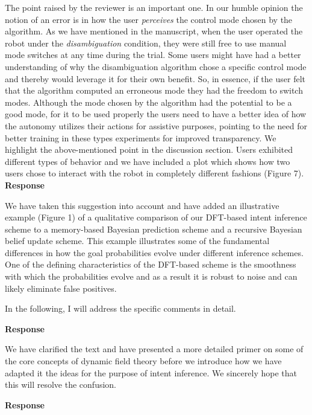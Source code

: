 \documentclass[a4paper,twoside,11pt]{reviewresponse}
\begin{document}
The point raised by the reviewer is an important one.  In our humble opinion the notion of an error is in how the user \textit{perceives} the control mode chosen by the algorithm. As we have mentioned in the manuscript, when the user operated the robot under the \textit{disambiguation} condition, they were still free to use manual mode switches at any time during the trial. Some users might have had a better understanding of why the disambiguation algorithm chose a specific control mode and thereby would leverage it for their own benefit. So, in essence, if the user felt that the algorithm computed an erroneous mode they had the freedom to switch modes. Although the mode chosen by the algorithm had the potential to be a good mode, for it to be used properly the users need to have a better idea of how the autonomy utilizes their actions for assistive purposes, pointing to the need for better training in these types experiments for improved transparency. We highlight the above-mentioned point in the discussion section. Users exhibited different types of behavior and we have included a plot which shows how two users chose to interact with the robot in completely different fashions (Figure 7).
\textbf{Response}

We have taken this suggestion into account and have added an illustrative example (Figure 1) of a qualitative comparison of our DFT-based intent inference scheme to a memory-based Bayesian prediction scheme and a recursive Bayesian belief update scheme. This example illustrates some of the fundamental differences in how the goal probabilities evolve under different inference schemes. One of the defining characteristics of the DFT-based scheme is the smoothness with which the probabilities evolve and as a result it is robust to noise and can likely eliminate false positives. 


In the following, I will address the specific comments in detail. 

\textbf{Response}

We have clarified the text and have presented a more detailed primer on some of the core concepts of dynamic field theory before we introduce how we have adapted it the ideas for the purpose of intent inference. We sincerely hope that this will resolve the confusion. 

\textbf{Response}
\end{document}
